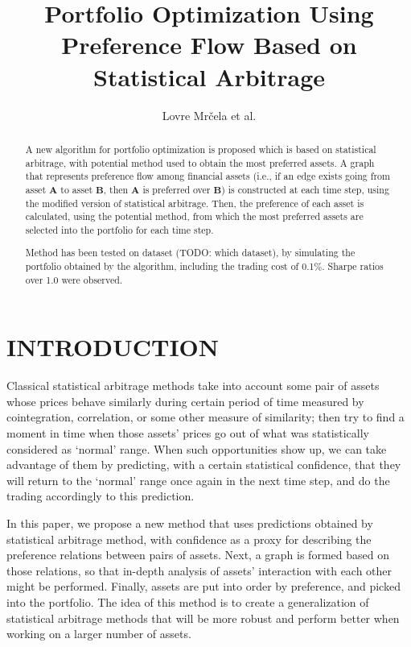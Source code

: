 \documentclass[letterpaper, 10 pt, conference]{ieeeconf}
\title{\LARGE \bf Portfolio Optimization Using Preference Flow Based on Statistical Arbitrage}
\author{Lovre Mr\v{c}ela et al.}
\begin{document}
  \maketitle
  \thispagestyle{empty}
  \pagestyle{empty}
    
  \begin{abstract}
    
  A new algorithm for portfolio optimization is proposed which is based on statistical arbitrage, with potential method used to obtain the most preferred assets.
  A graph that represents preference flow among financial assets (i.e., if an edge exists going from asset $\mathbold{A}$ to asset $\mathbold{B}$, then $\mathbold{A}$ is preferred over $\mathbold{B}$) is constructed at each time step, using the modified version of statistical arbitrage.
  Then, the preference of each asset is calculated, using the potential method\cite{caklovic}, from which the most preferred assets are selected into the portfolio for each time step.
  
  Method has been tested on dataset (TODO: which dataset), by simulating the portfolio obtained by the algorithm, including the trading cost of 0.1\%.
  Sharpe ratios over 1.0 were observed.
  
  \end{abstract}
  
  \section{INTRODUCTION}
  
  
  Classical statistical arbitrage methods take into account some pair of assets whose prices behave similarly during certain period of time measured by cointegration, correlation, or some other measure of similarity; then try to find a moment in time when those assets' prices go out of what was statistically considered as `normal' range.
  When such opportunities show up, we can take advantage of them by predicting, with a certain statistical confidence, that they will return to the `normal' range once again in the next time step, and do the trading accordingly to this prediction.
  
  In this paper, we propose a new method that uses predictions obtained by statistical arbitrage method, with confidence as a proxy for describing the preference relations between pairs of assets.
  Next, a graph is formed based on those relations, so that in-depth analysis of assets' interaction with each other might be performed.
  Finally, assets are put into order by preference, and picked into the portfolio.
  The idea of this method is to create a generalization of statistical arbitrage methods that will be more robust and perform better when working on a larger number of assets.
  
\end{document}

